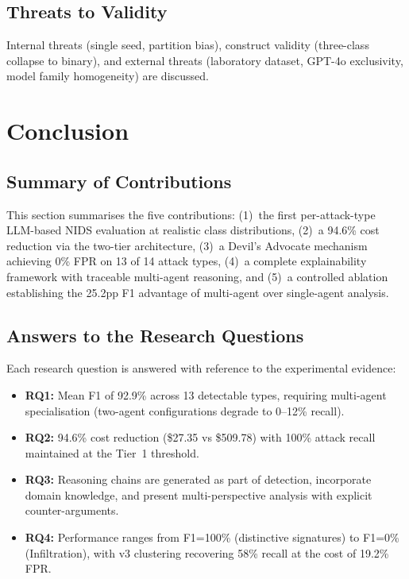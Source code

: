 \documentclass[12pt,openany,oneside,a4paper]{book}
\begin{document}
\section{Threats to Validity}
\label{sec:threats-to-validity}
Internal threats (single seed, partition bias), construct validity (three-class collapse to binary), and external threats (laboratory dataset, GPT-4o exclusivity, model family homogeneity) are discussed.


\chapter{Conclusion}
\label{ch:conclusion}

\section{Summary of Contributions}
\label{sec:summary-contributions}
This section summarises the five contributions: (1)~the first per-attack-type LLM-based NIDS evaluation at realistic class distributions, (2)~a 94.6\% cost reduction via the two-tier architecture, (3)~a Devil's Advocate mechanism achieving 0\% FPR on 13 of 14 attack types, (4)~a complete explainability framework with traceable multi-agent reasoning, and (5)~a controlled ablation establishing the 25.2pp F1 advantage of multi-agent over single-agent analysis.

\section{Answers to the Research Questions}
\label{sec:rq-answers}
Each research question is answered with reference to the experimental evidence:
\begin{itemize}[leftmargin=1.5em]
  \item \textbf{RQ1:} Mean F1 of 92.9\% across 13 detectable types, requiring multi-agent specialisation (two-agent configurations degrade to 0--12\% recall).
  \item \textbf{RQ2:} 94.6\% cost reduction (\$27.35 vs \$509.78) with 100\% attack recall maintained at the Tier~1 threshold.
  \item \textbf{RQ3:} Reasoning chains are generated as part of detection, incorporate domain knowledge, and present multi-perspective analysis with explicit counter-arguments.
  \item \textbf{RQ4:} Performance ranges from F1=100\% (distinctive signatures) to F1=0\% (Infiltration), with v3 clustering recovering 58\% recall at the cost of 19.2\% FPR.
\end{itemize}
\end{document}
